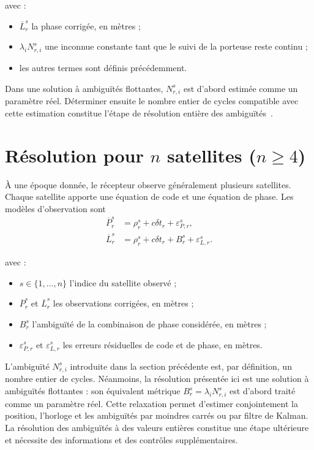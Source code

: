 avec :

\begin{itemize}
    \item $\overline L_r^s$ la phase corrigée, en mètres ;
    \item $\lambda_i N_{r,i}^s$ une inconnue constante tant que le suivi de la porteuse
    reste continu ;
    \item les autres termes sont définis précédemment.
\end{itemize}

Dans une solution à ambiguïtés flottantes, $N_{r,i}^s$ est d'abord estimée
comme un paramètre réel. Déterminer ensuite le nombre entier de cycles
compatible avec cette estimation constitue l'étape de résolution entière des
ambiguïtés~\cite{teunissen2017ambiguity}.

\section{\texorpdfstring{Résolution pour $n$ satellites ($n\geq4$)}{Résolution pour n satellites (n>=4)}}
\label{resolution}

À une époque donnée, le récepteur observe généralement plusieurs satellites.
Chaque satellite apporte une équation de code et une équation de phase. Les
modèles d'observation sont
\begin{align}
\overline P_r^s
&=
\rho_r^s+c\delta t_r+\varepsilon_{P,r}^s,
\\
\overline L_r^s
&=
\rho_r^s+c\delta t_r+B_r^s+\varepsilon_{L,r}^s.
\label{eq:modeles_obs}
\end{align}

avec :

\begin{itemize}
    \item $s\in\{1,\ldots,n\}$ l'indice du satellite observé ;
    \item $\overline P_r^s$ et $\overline L_r^s$ les observations corrigées,
    en mètres ;
    \item $B_r^s$ l'ambiguïté de la combinaison de phase considérée, en
    mètres ;
    \item $\varepsilon_{P,r}^s$ et $\varepsilon_{L,r}^s$ les erreurs
    résiduelles de code et de phase, en mètres.
\end{itemize}

L'ambiguïté $N_{r,i}^s$ introduite dans la section précédente est, par
définition, un nombre entier de cycles. Néanmoins, la résolution présentée ici
est une solution à ambiguïtés flottantes : son équivalent métrique
$B_r^s=\lambda_iN_{r,i}^s$ est d'abord traité comme un paramètre réel. Cette
relaxation permet d'estimer conjointement la position, l'horloge et les
ambiguïtés par moindres carrés ou par filtre de Kalman. La résolution des
ambiguïtés à des valeurs entières constitue une étape ultérieure et nécessite
des informations et des contrôles supplémentaires.

